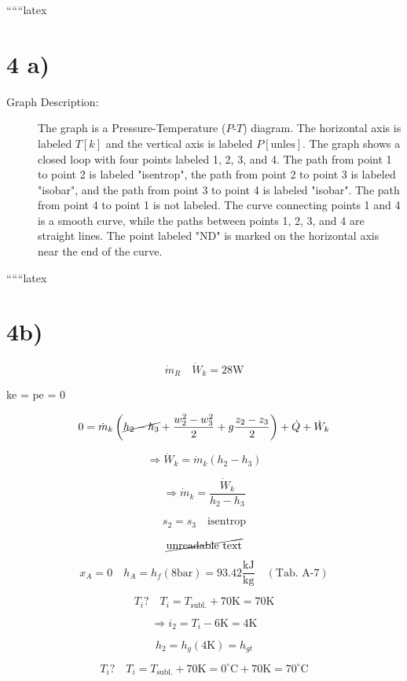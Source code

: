 
``````latex


\section*{4 a)}

\begin{description}
    \item[Graph Description:] The graph is a Pressure-Temperature ($P$-$T$) diagram. The horizontal axis is labeled $T [k]$ and the vertical axis is labeled $P [\text{unles}]$. The graph shows a closed loop with four points labeled 1, 2, 3, and 4. The path from point 1 to point 2 is labeled "isentrop", the path from point 2 to point 3 is labeled "isobar", and the path from point 3 to point 4 is labeled "isobar". The path from point 4 to point 1 is not labeled. The curve connecting points 1 and 4 is a smooth curve, while the paths between points 1, 2, 3, and 4 are straight lines. The point labeled "ND" is marked on the horizontal axis near the end of the curve.
\end{description}

``````latex


\section*{4b)}

\[
\dot{m}_R \quad \dot{W}_k = 28 \text{W}
\]

 ke = pe = 0   

\[
0 = \dot{m}_k \left( \cancel{h_2 - h_3} + \frac{w_2^2 - w_3^2}{2} + g \frac{z_2 - z_3}{2} \right) + \dot{Q} + \dot{W}_k
\]

\[
\Rightarrow \dot{W}_k = \dot{m}_k \left( h_2 - h_3 \right)
\]

\[
\Rightarrow \dot{m}_k = \frac{\dot{W}_k}{h_2 - h_3}
\]

\[
s_2 = s_3 \quad \text{isentrop}
\]

\[
\cancel{\text{unreadable text}}
\]

\[
x_A = 0 \quad h_A = h_f (8 \text{bar}) = 93.42 \frac{\text{kJ}}{\text{kg}} \quad (\text{Tab. A-7})
\]

\[
T_i? \quad T_i = T_{\text{subl.}} + 70 \text{K} = 70 \text{K}
\]

\[
\Rightarrow i_2 = T_i - 6 \text{K} = 4 \text{K}
\]

\[
h_2 = h_{g} (4 \text{K}) = h_{gt}
\]

\[
T_i? \quad T_i = T_{\text{subl.}} + 70 \text{K} = 0^\circ \text{C} + 70 \text{K} = 70^\circ \text{C}
\]

